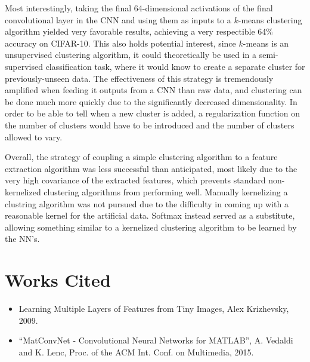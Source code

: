 \documentclass[11pt]{article}
\begin{document}
Most interestingly, taking the final 64-dimensional activations of the final convolutional layer in the CNN and using them as inputs to a $k$-means clustering algorithm yielded very favorable results, achieving a very respectible 64\% accuracy on CIFAR-10. This also holds potential interest, since $k$-means is an unsupervised clustering algorithm, it could theoretically be used in a semi-supervised classification task, where it would know to create a separate cluster for previously-unseen data. The effectiveness of this strategy is tremendously amplified when feeding it outputs from a CNN than raw data, and clustering can be done much more quickly due to the significantly decreased dimensionality. In order to be able to tell when a new cluster is added, a regularization function on the number of clusters would have to be introduced and the number of clusters allowed to vary.

Overall, the strategy of coupling a simple clustering algorithm to a feature extraction algorithm was less successful than anticipated, most likely due to the very high covariance of the extracted features, which prevents standard non-kernelized clustering algorithms from performing well. Manually kernelizing a clustring algorithm was not pursued due to the difficulty in coming up with a reasonable kernel for the artificial data. Softmax instead served as a substitute, allowing something similar to a kernelized clustering algorithm to be learned by the NN's.

\section{Works Cited}
\begin{itemize}
\item Learning Multiple Layers of Features from Tiny Images, Alex Krizhevsky, 2009.
\item ``MatConvNet - Convolutional Neural Networks for MATLAB'', A. Vedaldi and K. Lenc, Proc. of the ACM Int. Conf. on Multimedia, 2015.
\end{itemize}
\end{document}
